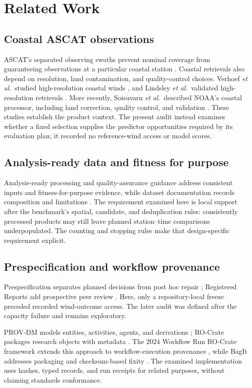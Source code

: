 \section{Related Work}
\subsection{Coastal ASCAT observations}
ASCAT's separated observing swaths prevent nominal coverage from guaranteeing observations at a particular coastal station \cite{eumetsat2022,wmo2026}. Coastal retrievals also depend on resolution, land contamination, and quality-control choices. Verhoef \emph{et al.}\ studied high-resolution coastal winds \cite{verhoef2012}, and Lindsley \emph{et al.}\ validated high-resolution retrievals \cite{lindsley2016}. More recently, Soisuvarn \emph{et al.}\ described NOAA's coastal processor, including land correction, quality control, and validation \cite{soisuvarn2023}. These studies establish the product context. The present audit instead examines whether a fixed selection supplies the predictor opportunities required by its evaluation plan; it recorded no reference-wind access or model scores.

\subsection{Analysis-ready data and fitness for purpose}
Analysis-ready processing \cite{dwyer2018} and quality-assurance guidance \cite{qa4eo2010} address consistent inputs and fitness-for-purpose evidence, while dataset documentation records composition and limitations \cite{gebru2021}. The requirement examined here is local support after the benchmark's spatial, candidate, and deduplication rules: consistently processed products may still leave planned station--time comparisons underpopulated. The counting and stopping rules make that design-specific requirement explicit.

\subsection{Prespecification and workflow provenance}
Prespecification separates planned decisions from post hoc repair \cite{nosek2018}; Registered Reports add prospective peer review \cite{chambers2015}. Here, only a repository-local freeze preceded recorded wind-outcome access. The later audit was defined after the capacity failure and remains exploratory.

PROV-DM models entities, activities, agents, and derivations \cite{prov2013}; RO-Crate packages research objects with metadata \cite{rocrate2022}. The 2024 Workflow Run RO-Crate framework extends this approach to workflow-execution provenance \cite{leo2024}, while BagIt addresses packaging and checksum-based fixity \cite{bagit2018}. The examined implementation uses hashes, typed records, and run receipts for related purposes, without claiming standards conformance.

